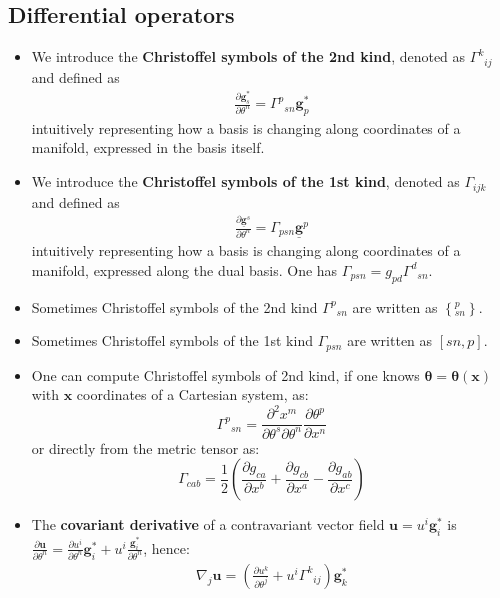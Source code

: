\documentclass{digitaldynamics}
\def\vect#1{\bm{#1}}
\def\vcovar#1{{\bm{#1}}^*}
\def\vcontr#1{\underline{\bm{#1}}}
\begin{document}
  



\subsection{Differential operators}

\begin{itemize}

  \item We introduce the \textbf{Christoffel symbols of the 2nd kind}, denoted as ${\Gamma^k}_{i j}$ and defined as
	\begin{align}
	   \frac{\partial \vcovar{g}_s}{\partial \theta^n} =  {\Gamma^p}_{sn} \vcovar{g}_p  
	\label{eq:christoffel2}
	\end{align}
	intuitively representing how a basis is changing along coordinates of a manifold, expressed in the basis itself.
	
	\item We introduce the \textbf{Christoffel symbols of the 1st kind}, denoted as ${\Gamma}_{i j k}$ and defined as
	\begin{align}
	   \frac{\partial \vcontr{g}^s}{\partial \theta^n} =  {\Gamma}_{p s n} \vcontr{g}^p 
	\label{eq:christoffel1}
	\end{align}
	intuitively representing how a basis is changing along coordinates of a manifold, expressed along the dual basis.
	One has $\Gamma_{psn} = g_{pd} {\Gamma^d}_{sn}$.
	
	\item Sometimes Christoffel symbols of the 2nd kind ${\Gamma^p}_{s n}$ are written as $\left\{{}^p_{s n} \right\}$. 
	\item Sometimes Christoffel symbols of the 1st kind ${\Gamma}_{p s n}$ are written as $[s n,p]$.
	
	\item One can compute Christoffel symbols of 2nd kind, if one knows $\vect{\theta}=\vect{\theta}(\vect{x})$ with $\vect{x}$ coordinates of a Cartesian system, as:
	\[
		{\Gamma^p}_{sn} = \frac{\partial^2 x^m}{\partial \theta^s \partial \theta^n} \frac{\partial \theta^p}{\partial x^n}
	\]
	or directly from the metric tensor as:
	\[
	 {\Gamma}_{cab} = \frac{1}{2} \left(\frac{\partial g_{ca}}{\partial x^b} + \frac{\partial g_{cb}}{\partial x^a} - \frac{\partial g_{ab}}{\partial x^c} \right)
	\]
	
	
	\item The \textbf{covariant derivative} of a contravariant vector field $\vect{u} = u^i \vcovar{g}_i$ is 
	$\frac{\partial \vect{u}}{\partial \theta^n} = \frac{\partial u^i}{\partial \theta^n} \vcovar{g}_i + u^i \frac{\vcovar{g}_i}{\partial \theta^n}$, hence:
	\begin{align}
	  \nabla_{j} \vect{u} = \left(\frac{\partial u^k}{\partial \theta^j} + u^i {\Gamma^k}_{ij} \right) \vcovar{g}_k
	\label{eq:covariantderivative}
	\end{align}
	

\end{itemize}
\end{document}
